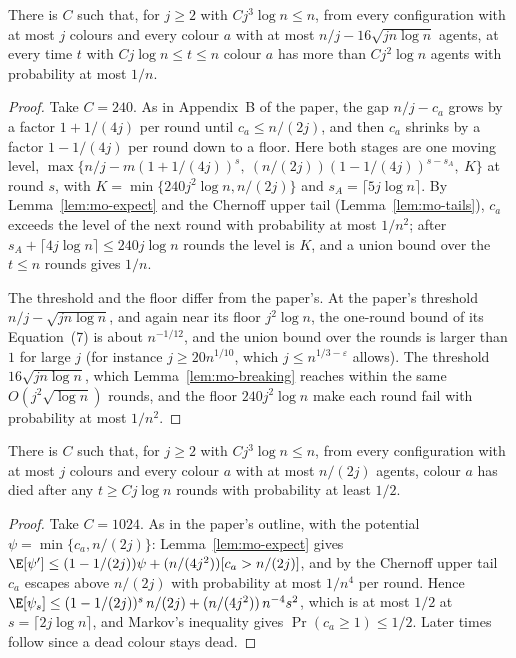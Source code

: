 \begin{lemma}\label{lem:mo-stage1}
\leanok
{}
There is $C$ such that, for $j\ge2$ with $Cj^3\log n\le n$, from every configuration with at most
$j$ colours and every colour $a$ with at most $n/j-16\sqrt{jn\log n}$ agents, at every time $t$
with $Cj\log n\le t\le n$ colour $a$ has more than $Cj^2\log n$ agents with probability at most
$1/n$.
\end{lemma}
\begin{proof}\leanok
Take $C=240$. As in Appendix~B of the paper, the gap $n/j-c_a$ grows by a factor $1+1/(4j)$ per
round until $c_a\le n/(2j)$, and then $c_a$ shrinks by a factor $1-1/(4j)$ per round down to a
floor. Here both stages are one moving level,
$\max\{n/j-m(1+1/(4j))^s,\ (n/(2j))(1-1/(4j))^{s-s_A},\ K\}$ at round $s$, with
$K=\min\{240j^2\log n,n/(2j)\}$ and $s_A=\lceil5j\log n\rceil$. By Lemma~\ref{lem:mo-expect} and
the Chernoff upper tail (Lemma~\ref{lem:mo-tails}), $c_a$ exceeds the level of the next round
with probability at most $1/n^2$; after $s_A+\lceil4j\log n\rceil\le240j\log n$ rounds the level
is $K$, and a union bound over the $t\le n$ rounds gives $1/n$.

The threshold and the floor differ from the paper's. At the paper's threshold
$n/j-\sqrt{jn\log n}$, and again near its floor $j^2\log n$, the one-round bound of its
Equation~(7) is about $n^{-1/12}$, and the union bound over the rounds is larger than $1$ for large
$j$ (for instance $j\ge20n^{1/10}$, which $j\le n^{1/3-\varepsilon}$ allows). The threshold $16\sqrt{jn\log n}$,
which Lemma~\ref{lem:mo-breaking} reaches within the same $O(j^2\sqrt{\log n})$ rounds, and the
floor $240j^2\log n$ make each round fail with probability at most $1/n^2$.
\end{proof}

\begin{lemma}\label{lem:mo-stage2}
\leanok
{}
There is $C$ such that, for $j\ge2$ with $Cj^3\log n\le n$, from every configuration with at most
$j$ colours and every colour $a$ with at most $n/(2j)$ agents, colour $a$ has died after any
$t\ge Cj\log n$ rounds with probability at least $1/2$.
\end{lemma}
\begin{proof}\leanok
Take $C=1024$. As in the paper's outline, with the potential $\psi=\min\{c_a,n/(2j)\}$:
Lemma~\ref{lem:mo-expect} gives $\E[\psi']\le(1-1/(2j))\psi+(n/(4j^2))[c_a>n/(2j)]$, and by the
Chernoff upper tail $c_a$ escapes above $n/(2j)$ with probability at most $1/n^4$ per round.
Hence $\E[\psi_s]\le(1-1/(2j))^s\,n/(2j)+(n/(4j^2))\,n^{-4}s^2$, which is at most $1/2$ at
$s=\lceil2j\log n\rceil$, and Markov's inequality gives $\Pr(c_a\ge1)\le1/2$. Later times follow
since a dead colour stays dead.
\end{proof}

